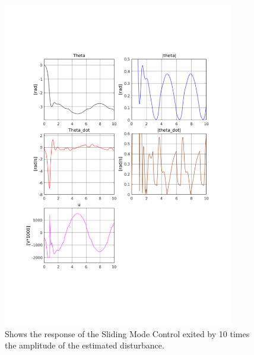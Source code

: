 \begin{figure}[H]
        \centering
        \includegraphics[width=0.9\textwidth,trim=0.5cm 5cm 0.5cm 4cm, clip]{smc_extreme_dis.pdf}
        \caption{Shows the response of the Sliding Mode Control exited by 10 times the amplitude of the estimated disturbance.}
        \label{fig:smc_extreme}
\end{figure}

